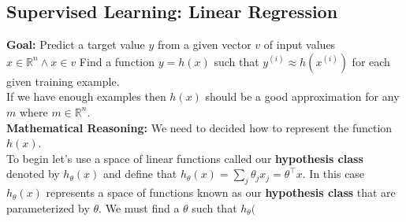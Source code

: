 \documentclass{achemso}
\begin{document}
\subsection{Supervised Learning: Linear Regression}
\textbf{Goal: }Predict a target value $y$ from a given vector $v$ of input values $x \in \mathbb{R}^n \wedge x \in v$ 
Find a function $y = h(x)$ such that $y^{(i)} \approx h(x^{(i)})$ for each given training example.\\ If we have enough examples then $h(x)$ should be a good approximation for any $m$ where $m \in \mathbb{R}^n$.\\
\textbf{Mathematical Reasoning: } We need to decided how to represent the function $h(x)$.\\ To begin let's use a space of linear functions called our \textbf{hypothesis class} denoted by $h_\theta(x)$ and define that   $h_\theta(x) = \sum_j \theta_j x_j = \theta^\top x$. In this case $h_\theta(x)$ represents a space of functions known as our \textbf{hypothesis class} that are parameterized by $\theta$. We must find a $\theta$ such that $h_\theta($
\end{document}
